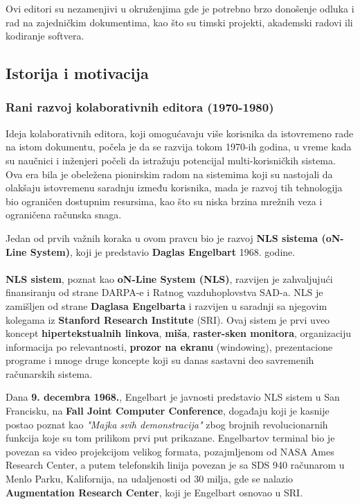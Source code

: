 \documentclass[12pt]{article}
\begin{document}
    Ovi editori su nezamenjivi u okruženjima gde je potrebno brzo donošenje odluka i rad na zajedničkim dokumentima, kao što su timski projekti, akademski radovi ili kodiranje softvera.

    \subsection{Istorija i motivacija}
   

    \subsubsection{Rani razvoj kolaborativnih editora (1970-1980)}

    Ideja kolaborativnih editora, koji omogućavaju više korisnika da istovremeno rade na istom dokumentu, počela je da se razvija tokom 1970-ih godina, u vreme kada su naučnici i inženjeri počeli da istražuju potencijal multi-korisničkih sistema. Ova era bila je obeležena pionirskim radom na sistemima koji su nastojali da olakšaju istovremenu saradnju između korisnika, mada je razvoj tih tehnologija bio ograničen dostupnim resursima, kao što su niska brzina mrežnih veza i ograničena računska snaga.
    
    Jedan od prvih važnih koraka u ovom pravcu bio je razvoj \textbf{NLS sistema (oN-Line System)}, koji je predstavio \textbf{Daglas Engelbart} 1968. godine.

    \paragraph{}
    \textbf{NLS sistem}, poznat kao \textbf{oN-Line System (NLS)}, razvijen je zahvaljujući finansiranju od strane DARPA-e i Ratnog vazduhoplovstva SAD-a. NLS je zamišljen od strane \textbf{Daglasa Engelbarta} i razvijen u saradnji sa njegovim kolegama iz \textbf{Stanford Research Institute} (SRI). Ovaj sistem je prvi uveo koncept \textbf{hipertekstualnih linkova}, \textbf{miša}, \textbf{raster-sken monitora}, organizaciju informacija po relevantnosti, \textbf{prozor na ekranu} (windowing), prezentacione programe i mnoge druge koncepte koji su danas sastavni deo savremenih računarskih sistema.
    
    Dana \textbf{9. decembra 1968.}, Engelbart je javnosti predstavio NLS sistem u San Francisku, na \textbf{Fall Joint Computer Conference}, događaju koji je kasnije postao poznat kao \textit{"Majka svih demonstracija"} zbog brojnih revolucionarnih funkcija koje su tom prilikom prvi put prikazane. Engelbartov terminal bio je povezan sa video projekcijom velikog formata, pozajmljenom od NASA Ames Research Center, a putem telefonskih linija povezan je sa SDS 940 računarom u Menlo Parku, Kalifornija, na udaljenosti od 30 milja, gde se nalazio \textbf{Augmentation Research Center}, koji je Engelbart osnovao u SRI.
    
\end{document}
